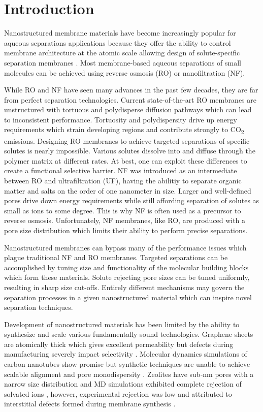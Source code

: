 \section*{Introduction}

Nanostructured membrane materials have become increasingly popular for 
aqueous separations applications because they offer the ability to 
control membrane architecture at the atomic scale allowing design of 
solute-specific separation membranes \cite{humplik_nanostructured_2011}.
Most membrane-based aqueous separations of small molecules can be 
achieved using reverse osmosis (RO) or nanofiltration (NF). 

While RO and NF have seen many advances in the past few decades, they 
are far from perfect separation technologies. Current state-of-the-art
RO membranes are unstructured with tortuous and polydisperse diffusion
pathways which can lead to inconsistent performance. Tortuosity and 
polydispersity drive up energy requirements which strain developing regions and 
contribute strongly to CO\textsubscript{2} emissions. Designing RO 
membranes to achieve targeted separations of specific solutes is nearly
impossible. Various solutes dissolve into and diffuse through the polymer
matrix at different rates. At best, one can exploit these differences 
to create a functional selective barrier. NF was introduced as an 
intermediate between RO and ultrafiltration (UF), having the abilitiy to
separate organic matter and salts on the order of one nanometer in size.
Larger and well-defined pores drive down energy requirements while still
affording separation of solutes as small as ions to some degree. This is
why NF is often used as a precursor to reverse osmosis. Unfortunately,
NF membranes, like RO, are produced with a pore size distribution which 
limits their ability to perform precise separations.

Nanostructured membranes can bypass many of the performance issues which
plague traditional NF and RO membranes. Targeted separations can be 
accomplished by tuning size and functionality of the molecular building
blocks which form these materials. Solute rejecting pore sizes can be
tuned uniformly, resulting in sharp size cut-offs. Entirely different
mechanisms may govern the separation processes in a given nanostructured
material which can inspire novel separation techniques.
	
Development of nanostructured materials has been limited by the ability
to synthesize and scale various fundamentally sound technologies.
Graphene sheets are atomically thick which gives excellent permeability
but defects during manufacturing severely impact selectivity 
\cite{cohen-tanugi_multilayer_2016}. Molecular dynamics simulations of
carbon nanotubes show promise \cite{humplik_nanostructured_2011} but 
synthetic techniques are unable to achieve scalable alignment and pore
monodispersity \cite{hata_water-assisted_2004,maruyama_growth_2005}.
Zeolites have sub-nm pores with a narrow size distribution and MD simulations
exhibited complete rejection of solvated ions \cite{murad_molecular_1998},
however, experimental rejection was low and attributed to interstitial
defects formed during membrane synthesis \cite{li_desalination_2004}.
	  
